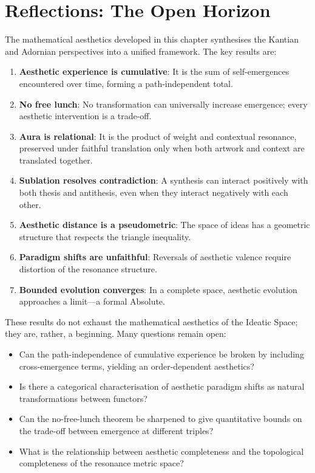 \section{Reflections: The Open Horizon}

The mathematical aesthetics developed in this chapter synthesises the
Kantian and Adornian perspectives into a unified framework.  The key results
are:

\begin{enumerate}
\item \textbf{Aesthetic experience is cumulative}: It is the sum of
self-emergences encountered over time, forming a path-independent total.

\item \textbf{No free lunch}: No transformation can universally increase
emergence; every aesthetic intervention is a trade-off.

\item \textbf{Aura is relational}: It is the product of weight and
contextual resonance, preserved under faithful translation only when
both artwork and context are translated together.

\item \textbf{Sublation resolves contradiction}: A synthesis can interact
positively with both thesis and antithesis, even when they interact
negatively with each other.

\item \textbf{Aesthetic distance is a pseudometric}: The space of ideas
has a geometric structure that respects the triangle inequality.

\item \textbf{Paradigm shifts are unfaithful}: Reversals of aesthetic
valence require distortion of the resonance structure.

\item \textbf{Bounded evolution converges}: In a complete space, aesthetic
evolution approaches a limit---a formal Absolute.
\end{enumerate}

These results do not exhaust the mathematical aesthetics of the Ideatic
Space; they are, rather, a beginning.  Many questions remain open:

\begin{itemize}
\item Can the path-independence of cumulative experience be broken by
including cross-emergence terms, yielding an order-dependent aesthetics?

\item Is there a categorical characterisation of aesthetic paradigm shifts
as natural transformations between functors?

\item Can the no-free-lunch theorem be sharpened to give quantitative
bounds on the trade-off between emergence at different triples?

\item What is the relationship between aesthetic completeness and the
topological completeness of the resonance metric space?
\end{itemize}

